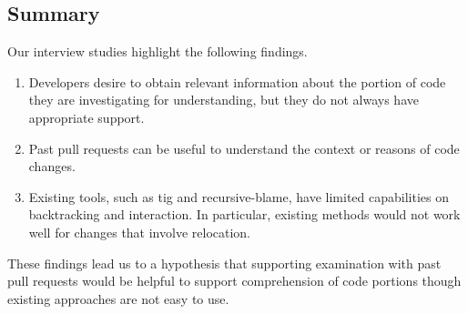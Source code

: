 



\subsection{Summary}
Our interview studies highlight the following findings.

\begin{enumerate}
\setlength{\parskip}{1mm}
\setlength{\itemsep}{0mm}
\item Developers desire to obtain relevant information about the portion of code they are investigating for understanding, but they do not always have appropriate support.
\item Past pull requests can be useful to understand the context or reasons of code changes.
\item Existing tools, such as tig and recursive-blame, have limited capabilities on backtracking and interaction. In particular, existing methods would not work well for changes that involve relocation.
\end{enumerate}

These findings lead us to a hypothesis that supporting examination with past pull requests would be helpful to support comprehension of code portions though existing approaches are not easy to use.


      
      
      
      

     